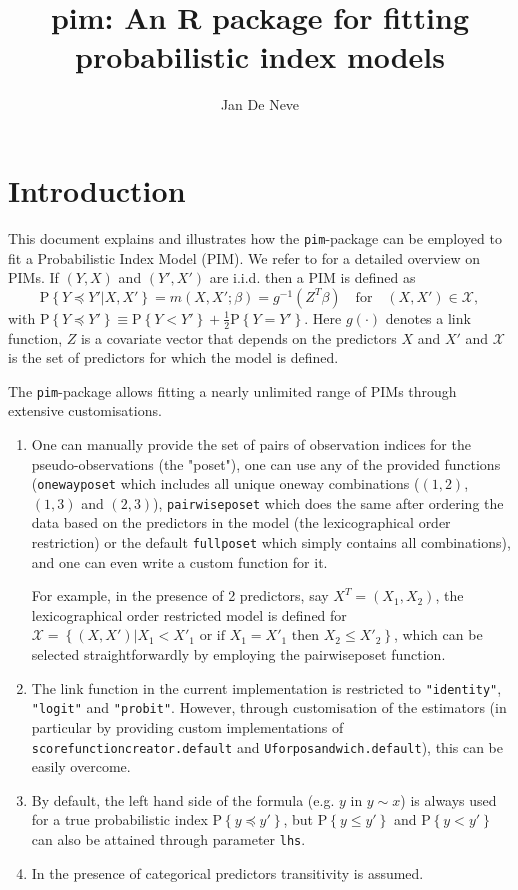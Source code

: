 \documentclass[12pt]{article}
\author{Jan De Neve}
\newcommand{\prob}[1]{\text{P}\left\{#1\right\}}
\newcommand{\leqs}{\preccurlyeq}
\newcommand{\pim}[1]{\texttt{#1}}%
\newcommand{\cd}[1]{\texttt{#1}}%
\begin{document}

\title{pim: An R package for fitting probabilistic index models}

\maketitle
\tableofcontents
\section{Introduction}\label{S_intro}

This document explains and illustrates how the \pim{pim}-package can be employed to fit a Probabilistic Index Model (PIM). We refer to \cite{Thas2012} for a detailed overview on PIMs. If $(Y,X)$ and $(Y',X')$ are i.i.d. then a PIM is defined as
\begin{equation}\label{pim}
\prob{Y \leqs Y' | X, X'} = m(X,X';\beta) = g^{-1}(Z^T \beta) \quad \text{for} \quad (X,X') \in \mathcal{X},
\end{equation}
with $\prob{Y \leqs Y'} \equiv  \prob{Y < Y'} + \frac{1}{2} \prob{Y = Y'}$. Here $g(\cdot)$ denotes a link function, $Z$ is a covariate vector that depends on the predictors $X$ and $X'$ and $\mathcal{X}$ is the set of predictors for which the model is defined. 

The \pim{pim}-package allows fitting a nearly unlimited range of PIMs through extensive customisations.
\begin{enumerate}
\item One can manually provide the set of pairs of observation indices for the pseudo-observations (the "poset"), one can use any of the provided functions (\pim{onewayposet} which includes all unique oneway combinations ($(1,2)$, $(1,3)$ and $(2,3)$), \pim{pairwiseposet} which does the same after ordering the data based on the predictors in the model (the lexicographical order restriction) or the default \pim{fullposet} which simply contains all combinations), and one can even write a custom function for it.

For example, in the presence of 2 predictors, say $X^T = (X_1, X_2)$, the lexicographical order restricted model is defined for $\mathcal{X} = \left\{ (X,X') | X_1 < X'_1 \text{ or if } X_1 = X'_1 \text{ then } X_2 \leq X'_2 \right\}$, which can be selected straightforwardly by employing the pairwiseposet function. 
\item The link function in the current implementation is restricted to \cd{"identity"}, \cd{"logit"} and \cd{"probit"}. However, through customisation of the estimators (in particular by providing custom implementations of \pim{scorefunctioncreator.default} and \pim{Uforposandwich.default}), this can be easily overcome.
\item By default, the left hand side of the formula (e.g. $y$ in $y\sim x$) is always used for a true probabilistic index $\prob{y \leqs y' }$, but $\prob{y \leq y' }$ and $\prob{y < y' }$ can also be attained through parameter \cd{lhs}.
\item In the presence of categorical predictors transitivity is assumed.
\end{enumerate} 
\end{document}
